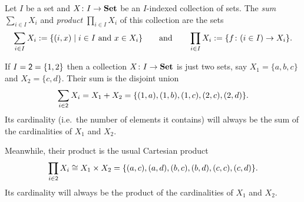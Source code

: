 \documentclass[Book-Poly]{subfiles}
\begin{document}
\begin{definition}
Let $I$ be a set and $X\colon I\to\mathbf{Set}$ be an $I$-indexed collection of sets. The \emph{sum} $\sum_{i\in I}X_i$ and \emph{product} $\prod_{i\in I}X_i$ of this collection are the sets
\[
\sum_{i\in I}X_i:=\{(i,x)\mid i\in I\text{ and }x\in X_i\}
\qquad\text{and}\qquad
\prod_{i\in I}X_i:=\{f \colon (i \in I) \to X_i\}.
\]
\end{definition}

\begin{example}\label{ex.two_sums_and_prods}
If $I=\textsf{2}=\{1,2\}$ then a collection $X\colon I\to \mathbf{Set}$ is just two sets, say $X_1=\{a,b,c\}$ and $X_2=\{c,d\}$. Their sum is the disjoint union
\[\sum_{i\in \textsf{2}}X_i=X_1+X_2=\{(1,a),(1,b),(1,c),(2,c),(2,d)\}.\]
Its cardinality (i.e.\ the number of elements it contains) will always be the sum of the cardinalities of $X_1$ and $X_2$.

Meanwhile, their product is the usual Cartesian product
\[\prod_{i\in \textsf{2}}X_i \cong X_1\times X_2=\{(a,c),(a,d),(b,c),(b,d),(c,c),(c,d)\}.\]
Its cardinality will always be the product of the cardinalities of $X_1$ and $X_2$.
\end{example}
\end{document}
